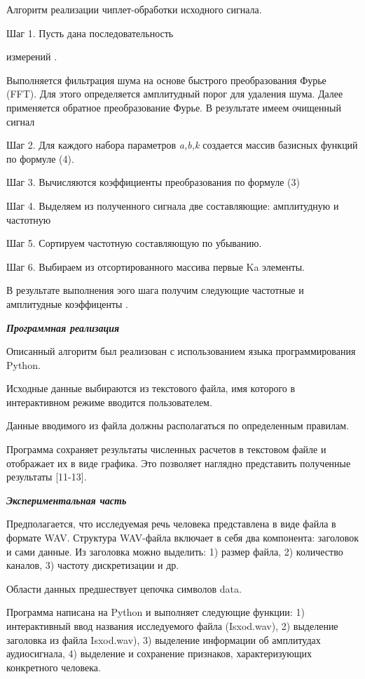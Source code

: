 Алгоритм реализации чиплет-обработки исходного сигнала.

Шаг 1. Пусть дана последовательность

измерений
.

Выполняется фильтрация шума на основе быстрого преобразования Фурье
(FFT). Для этого определяется амплитудный порог для удаления шума. Далее
применяется обратное преобразование Фурье. В результате имеем очищенный
сигнал

Шаг 2. Для каждого набора параметров \emph{a,b,k} создается массив
базисных функций
по
формуле (4).

Шаг 3. Вычисляются коэффициенты преобразования по формуле (3)

Шаг 4. Выделяем из полученного сигнала две составляющие: амплитудную и
частотную

Шаг 5. Сортируем частотную составляющую по убыванию.

Шаг 6. Выбираем из отсортированного массива первые Ka элементы.

В результате выполнения эого шага получим следующие частотные и
амплитудные коэффиценты
.

\emph{{\bfseries Программная реализация}}

Описанный алгоритм был реализован с использованием языка
программирования Python.

Исходные данные выбираются из текстового файла, имя которого в
интерактивном режиме вводится пользователем.

Данные вводимого из файла должны располагаться по определенным правилам.

Программа сохраняет результаты численных расчетов в текстовом файле и
отображает их в виде графика. Это позволяет наглядно представить
полученные результаты {[}11-13{]}.

\emph{{\bfseries Экспериментальная часть}}

Предполагается, что исследуемая речь человека представлена в виде файла
в формате WAV. Структура WAV-файла включает в себя два компонента:
заголовок и сами данные. Из заголовка можно выделить: 1) размер файла,
2) количество каналов, 3) частоту дискретизации и др.

Области данных предшествует цепочка символов data.

Программа написана на Python и выполняет следующие функции: 1)
интерактивный ввод названия исследуемого файла (Isxod.wav), 2) выделение
заголовка из файла Isxod.wav), 3) выделение информации об амплитудах
аудиосигнала, 4) выделение и сохранение признаков, характеризующих
конкретного человека.

